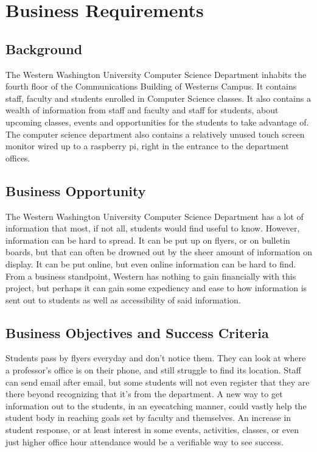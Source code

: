 \section{Business Requirements}
\subsection{Background}
 The Western Washington University Computer Science Department inhabits the fourth floor of the Communications Building of Westerns Campus.  It contains staff, faculty and students enrolled in Computer Science classes.  It also contains a wealth of information from staff and faculty and staff for students, about upcoming classes, events and opportunities for the students to take advantage of.   The computer science department also contains a relatively unused touch screen monitor wired up to a raspberry pi, right in the entrance to the department offices. 

\subsection{Business Opportunity}
 The Western Washington University Computer Science Department has a lot of information that most, if not all, students would find useful to know.  However, information can be hard to spread.  It can be put up on flyers, or on bulletin boards, but that can often be drowned out by the sheer amount of information on display.  It can be put online, but even online information can be hard to find.  From a business standpoint, Western has nothing to gain financially with this project, but perhaps it can gain some expediency and ease to how information is sent out to students as well as accessibility of said information.

\subsection{Business Objectives and Success Criteria}
 Students pass by flyers everyday and don't notice them.  They can look at where a professor's office is on their phone, and still struggle to find its location.  Staff can send email after email, but some students will not even register that they are there beyond recognizing that it's from the department.  A new way to get information out to the students, in an eyecatching manner, could vastly help the student body in reaching goals set by faculty and themselves.  An increase in student response, or at least interest in some events, activities, classes, or even just higher office hour attendance would be a verifiable way to see success.

